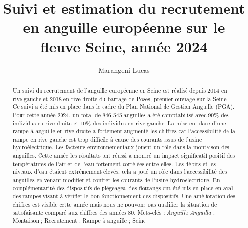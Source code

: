 \documentclass[11pt,titlepage,twoside]{article}\usepackage[]{graphicx}\usepackage[table]{xcolor}
\title{Suivi et estimation du recrutement en anguille européenne sur le fleuve Seine,
année 2024}
\author[1]{Marangoni Lucas}
\affil[1]{Seine-Normandie Migrateurs, 11 cours Clemenceau 76100 Rouen}
\begin{document}
\hypersetup{pageanchor=false}

\begin{titlepage}



\end{titlepage}



\newpage
\thispagestyle{empty}
\strut
\newpage

 \setcounter{page}{1}

\maketitle

\begin{abstract}

Un suivi du recrutement de l’anguille européenne en Seine est réalisé depuis 2014 en rive gauche et 2018 en rive droite du barrage de Poses, premier ouvrage sur la Seine. Ce suivi a été mis en place dans le cadre du Plan National de Gestion Anguille (PGA). Pour cette année 2024, un total de 846 545 anguilles a été comptabilisé avec 90\% des individus en rive droite et 10\% des individus en rive gauche. La mise en place d’une rampe à anguille en rive droite a fortement augmenté les chiffres car l’accessibilité de la rampe en rive gauche est trop difficile à cause des courants issus de l’usine hydroélectrique. Les facteurs environnementaux jouent un rôle dans la montaison des anguilles. Cette année les résultats ont réussi a montré un impact significatif positif des températures de l’air et de l’eau fortement corrélées entre elles. Les débits et les niveaux d’eau étaient extrêmement élevés, cela a joué un rôle dans l’accessibilité des anguilles en venant modifier et contrer les courants de l’usine hydroélectrique. En complémentarité des dispositifs de piégeages, des flottangs ont été mis en place en aval des rampes visant à vérifier le bon fonctionnement des dispositifs. Une amélioration des chiffres est visible cette année mais nous ne pouvons pas qualifier la situation de satisfaisante comparé aux chiffres des années 80.
Mots-clés :  \textit{Anguilla Anguilla} ; Montaison ; Recrutement ; Rampe à anguille ; Seine


\end{abstract}

\newpage

\tableofcontents

\clearpage
\end{document}
